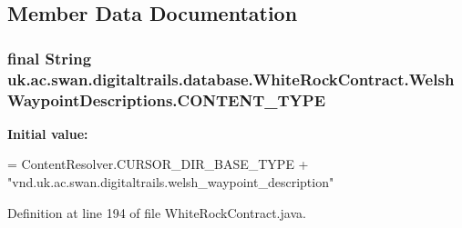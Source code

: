 \subsection{Member Data Documentation}
\hypertarget{classuk_1_1ac_1_1swan_1_1digitaltrails_1_1database_1_1_white_rock_contract_1_1_welsh_waypoint_descriptions_ae6176ca7e1479e47da4e5bb4a1881b84}{
\subsubsection[{C\+O\+N\+T\+E\+N\+T\+\_\+\+T\+Y\+P\+E}]{\setlength{\rightskip}{0pt plus 5cm}final String uk.\+ac.\+swan.\+digitaltrails.\+database.\+White\+Rock\+Contract.\+Welsh\+Waypoint\+Descriptions.\+C\+O\+N\+T\+E\+N\+T\+\_\+\+T\+Y\+P\+E\hspace{0.3cm}{\ttfamily [static]}}}\label{classuk_1_1ac_1_1swan_1_1digitaltrails_1_1database_1_1_white_rock_contract_1_1_welsh_waypoint_descriptions_ae6176ca7e1479e47da4e5bb4a1881b84}
{\bfseries Initial value\+:}
\begin{DoxyCode}
= ContentResolver.CURSOR\_DIR\_BASE\_TYPE +
                \textcolor{stringliteral}{"vnd.uk.ac.swan.digitaltrails.welsh\_waypoint\_description"}
\end{DoxyCode}


Definition at line 194 of file White\+Rock\+Contract.\+java.

